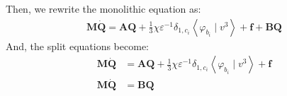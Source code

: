 \documentclass{article}
\newcommand{\bvec}[1]{\boldsymbol{#1}}
\newcommand{\bmat}[1]{\boldsymbol{#1}}
\begin{document}
\noindent Then, we rewrite the monolithic equation as:
\begin{align*}
    \bmat{M} \dot{\bvec{Q}}
        = \bmat{A} \bvec{Q}
            + \frac{1}{3} \chi \varepsilon^{-1} \delta_{1, c_i} \left< \varphi_{b_i} \mid v^3 \right>
            + \bvec{f}
            + \bmat{B} \bvec{Q}
\end{align*}
\noindent And, the split equations become:
\begin{align*}
    \bmat{M} \dot{\bvec{Q}}
        & = \bmat{A} \bvec{Q}
            + \frac{1}{3} \chi \varepsilon^{-1} \delta_{1, c_i} \left< \varphi_{b_i} \mid v^3 \right>
            + \bvec{f} \\
    \bmat{M} \dot{\bvec{Q}}
        & = \bmat{B} \bvec{Q}
\end{align*}
\end{document}
